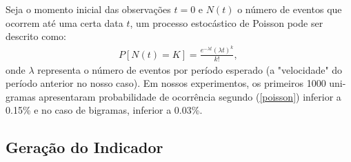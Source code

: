 \documentclass[paper=a4, fontsize=11pt]{scrartcl}
\numberwithin{equation}{section}		%
\numberwithin{figure}{section}			%
\numberwithin{table}{section}				%
\begin{document}
Seja o momento inicial das observações $t=0$ e $N(t)$ o número de eventos que ocorrem até uma certa data $t$, um processo estocástico de Poisson pode ser descrito como:
\begin{align}
	P[N(t)=K]=\frac{e^{-\lambda t} (\lambda t )^k}{k!},\,\! \label{poisson}
\end{align}
onde $\lambda$ representa o número de eventos por período esperado (a "velocidade"  do período anterior no nosso caso).
Em nossos experimentos, os primeiros 1000 uni-gramas apresentaram probabilidade de ocorrência segundo (\ref{poisson}) inferior a 0.15\% e no caso de bigramas, inferior a 0.03\%.

\subsection{Geração do Indicador}
\end{document}

